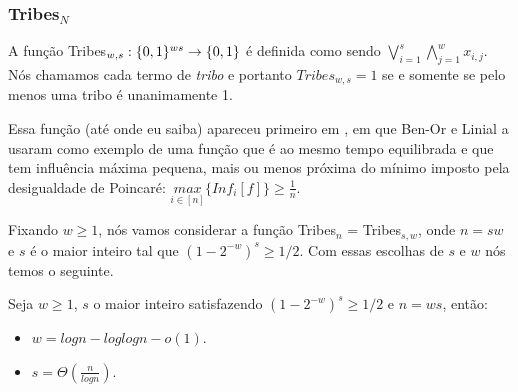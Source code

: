 \subsubsection{Tribes$_{N}$}

A função Tribes$_{w, s}: \{0, 1\}^{ws} \to \{0, 1\}$ é definida como sendo $\bigvee_{i = 1}^{s}\bigwedge_{j = 1}^{w} x_{i, j}$. Nós chamamos cada termo de \emph{tribo} e portanto $Tribes_{w, s} = 1$ se e somente se pelo menos uma tribo é unanimamente 1.

Essa função (até onde eu saiba) apareceu primeiro em \cite{ben1990collective}, em que Ben-Or e Linial a usaram como exemplo de uma função que é ao mesmo tempo equilibrada e que tem influência máxima pequena, mais ou menos próxima do mínimo imposto pela desigualdade de Poincaré: $\underset{i \in [n]}{max}\{Inf_{i}[f]\} \geq \frac{1}{n}$.

Fixando $w \geq 1$, nós vamos considerar a função Tribes$_{n}$ = Tribes$_{s, w}$, onde $n = sw$ e $s$ é o maior inteiro tal que $(1 - 2^{-w})^{s} \geq 1/2$. Com essas escolhas de $s$ e $w$ nós temos o seguinte.

\begin{prop} \label{prop: tribes_n}

    Seja $w \geq 1$, $s$ o maior inteiro satisfazendo $(1 - 2^{-w})^{s} \geq 1/2$ e $n = ws$, então: 

    \begin{itemize}

        \item $w = logn - loglogn - o(1)$.

        \item $s = \Theta(\frac{n}{logn})$.

    \end{itemize}

\end{prop}

